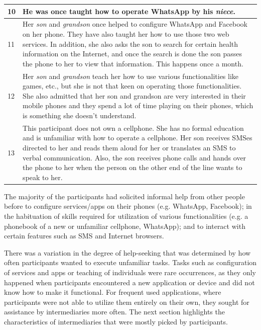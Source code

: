 \begin{table}[h!]
\begin{center}
\begin{tabular}{|p{0.5cm}|p{13cm}|}
	\hline
	10& He was once taught how to operate WhatsApp by his \emph{niece}.\\
	\hline
	11&Her \emph{son} and \emph{grandson} once helped to configure WhatsApp and Facebook on her phone. They have also taught her how to use those two web services. In addition, she also asks the son to search for certain health information on the Internet, and once the search is done the son passes the phone to her to view that information. This happens once a month.\\
	\hline
	12& Her \emph{son} and \emph{grandson} teach her how to use various functionalities like games, etc., but she is not that keen on operating those functionalities. She also admitted that her son and grandson are very interested in their mobile phones and they spend a lot of time playing on their phones, which is something she doesn't understand.\\
	\hline
	13& This participant does not own a cellphone. She has no formal education and is unfamiliar with how to operate a cellphone. Her son receives SMSes directed to her and reads them aloud for her or translates an SMS to verbal communication. Also, the son receives phone calls and hands over the phone to her when the person on the other end of the line wants to speak to her.\\
	\hline
	\end{tabular}
  \end{center}
\end{table}

The majority of the participants had solicited  informal help from other people before to configure services/apps on their phones (e.g. WhatsApp, Facebook); in the habituation of skills required for utilization of various functionalities (e.g. a phonebook of a new or unfamiliar cellphone, WhatsApp); and to interact with certain features such as SMS and Internet browsers.

There was a variation in the degree of help-seeking that was determined by how often participants wanted to execute unfamiliar tasks. Tasks such as configuration of services and apps or teaching of individuals were rare occurrences, as they only happened when participants encountered a new application or device and did not know how to make it functional. For frequent used applications, where participants were not able to utilize them entirely on their own, they sought for assistance by intermediaries more often. The next section highlights the characteristics of intermediaries that were mostly picked by participants.
